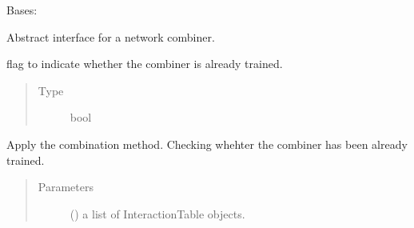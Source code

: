 \documentclass[letterpaper,10pt,english]{sphinxmanual}
\begin{document}
\begin{fulllineitems}
\label{\detokenize{_modules/cosifer.combiners:cosifer.combiners.network_combiner.NetworkCombiner}}
Bases: {\hyperref[\detokenize{_modules/cosifer.handlers:cosifer.handlers.network_handler.NetworkHandler}]{}}

Abstract interface for a network combiner.

\begin{fulllineitems}
\label{\detokenize{_modules/cosifer.combiners:cosifer.combiners.network_combiner.NetworkCombiner.trained}}
flag to indicate whether the combiner is
already trained.
\begin{quote}\begin{description}
\item[{Type}] \leavevmode
bool

\end{description}\end{quote}

\end{fulllineitems}


\begin{fulllineitems}
\label{\detokenize{_modules/cosifer.combiners:cosifer.combiners.network_combiner.NetworkCombiner.combine}}
Apply the combination method. Checking whehter the combiner has been
already trained.
\begin{quote}\begin{description}
\item[{Parameters}] \leavevmode
{} () \textendash{} a list of InteractionTable objects.

\end{description}\end{quote}

\end{fulllineitems}


\end{fulllineitems}
\end{document}
